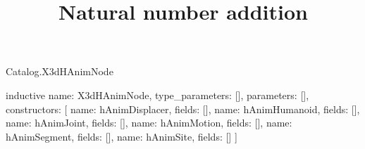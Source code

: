 \begin{lexlean}{Catalog.X3dHAnimNode}
\title{Natural number addition}
\begin{semanticmodule}
inductive{
  name: X3dHAnimNode,
  type_parameters: [],
  parameters: [],
  constructors: [
    {name: hAnimDisplacer, fields: []},
    {name: hAnimHumanoid, fields: []},
    {name: hAnimJoint, fields: []},
    {name: hAnimMotion, fields: []},
    {name: hAnimSegment, fields: []},
    {name: hAnimSite, fields: []}
  ]
}
\end{semanticmodule}
\end{lexlean}
